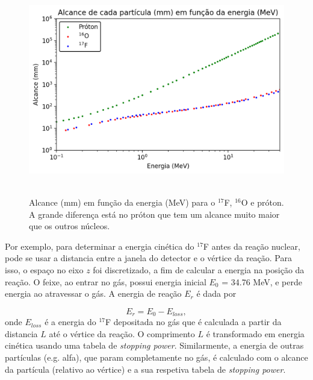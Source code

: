 \documentclass[a4paper,12pt,oneside]{book}
\begin{document}
 \begin{figure}[H]
     \centering
     \includegraphics[scale = 0.85]{figs/alcance_vs_energia_2.png}\
     \caption{Alcance (mm) em função da energia (MeV) para o $^{17}$F, $^{16}$O e próton. A grande diferença está no próton que tem um alcance muito maior que os outros núcleos.}
     \label{fig:alcance_vs_energia}
 \end{figure}

\par Por exemplo, para determinar a energia cinética do $^{17}$F antes da reação nuclear, pode se usar a distancia entre a janela do detector e o vértice da reação. Para isso, o espaço no eixo $z$ foi discretizado, a fim de calcular a energia na posição da reação. O feixe, ao entrar no gás, possui energia inicial $E_0$ = 34.76 MeV, e perde energia ao atravessar o gás. A energia de reação $E_r$ é dada por

\begin{equation}
	E_r = E_0 - E_{loss},
\end{equation}
%
onde $E_{loss}$ é a energia do $^{17}$F depositada no gás que é calculada a partir da distancia $L$ até o vértice da reação. O comprimento $L$ é transformado em energia cinética usando uma tabela de \textit{stopping power}. Similarmente, a energia de outras partículas (e.g. alfa), que param completamente no gás, é calculado com o alcance da partícula (relativo ao vértice) e a sua respetiva tabela de \textit{stopping power}.

\end{document}
